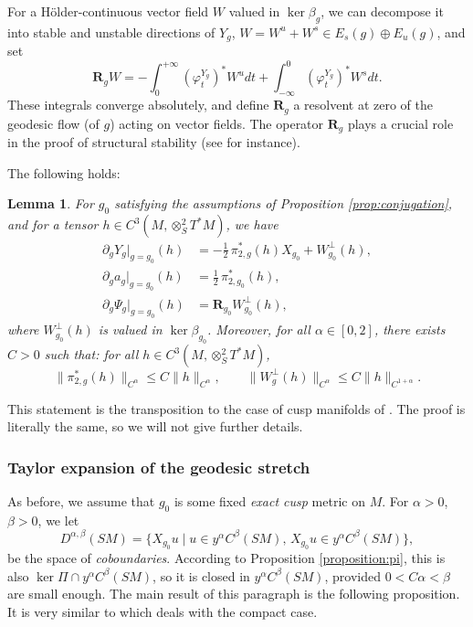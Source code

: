 \documentclass[JEP,XML,SOM,Unicode,NoFloatCountersInSection]{cedram}
\theoremstyle{plain}
\newtheorem{lemma}{Lemma}[section]
\theoremstyle{definition}
\begin{document}
For a Hölder-continuous vector field $W$ valued in $\ker\beta_{g}$, we can decompose it into stable and unstable directions of $Y_g$, $W = W^u + W^s \in E_s(g) \oplus E_u(g)$, and set
\[
\mathbf{R}_{g} W = - \int_0^{+\infty} (\varphi_t^{Y_g})^\ast W^u dt + \int_{-\infty}^0 (\varphi_t^{Y_g})^\ast W^s dt.
\]
These integrals converge absolutely, and define $\mathbf{R}_{g}$ a resolvent at zero of the geodesic flow (of $g$) acting on vector fields. {\color{black}The operator $\mathbf{R}_g$ plays a crucial role in the proof of structural stability (see \cite[Lem.\,5.4]{Bonthonneau-Lefeuvre-21} for instance).}

The following holds:

\begin{lemma}
For $g_0$ satisfying the assumptions of Proposition \ref{prop:conjugation}, and for a tensor $h \in C^3(M,\otimes^2_S T^*M)$, we have
\begin{align}
\partial_g Y_{g}|_{g=g_0}(h) & = - \frac{1}{2}\,\pi_{2,g}^\ast (h) X_{g_0} + W_{g_0}^\perp (h), \\
\partial_g a_{g}|_{g=g_0}(h) & = \frac{1}{2}\,\pi_{2,g_0}^\ast (h), \label{equation:ag} \\
\partial_g \Psi_{g}|_{g=g_0}(h) & = \mathbf{R}_{g_0} W_{g_0}^\perp(h),
\end{align}
where $W_{g_0}^\perp(h)$ is valued in $\ker\beta_{g_0}$. Moreover, for all $\alpha \in [0,2]$, there exists $C > 0$ such that: for all $h \in C^3(M,\otimes^2_S T^*M)$,
\begin{equation}
\label{equation:est}
\| \pi_{2,g}^\ast(h) \|_{C^\alpha} \leq C \|h\|_{C^\alpha}, \qquad \| W_g^\perp(h)\|_{C^\alpha} \leq C \|h\|_{C^{1+\alpha}}.
\end{equation}
\end{lemma}

This statement is the transposition to the case of cusp manifolds of \cite[Lem.\,5.4, 5.5 \& 5.6]{Bonthonneau-Lefeuvre-21}. The proof is literally the same, so we will not give further details.

\subsubsection{Taylor expansion of the geodesic stretch}

As before, we assume that $g_0$ is some fixed \emph{exact cusp} metric on $M$. For $\alpha >0$, $\beta>0$, we let
\[
D^{\alpha,\beta}(SM) = \{ X_{g_0} u\mid u\in y^\alpha C^\beta(SM),\, X_{g_0} u \in y^\alpha C^\beta(SM) \},
\]
be the space of \emph{coboundaries}. According to Proposition \ref{proposition:pi}, this is also $\ker \Pi\cap y^\alpha C^\beta(SM)$, so it is closed in $y^\alpha C^\beta(SM)$, provided $0<C\alpha< \beta$ are small enough. The main result of this paragraph is the following proposition. It is very similar to \cite[Prop.\,5.3]{Bonthonneau-Lefeuvre-21} which deals with the compact case.
\end{document}
